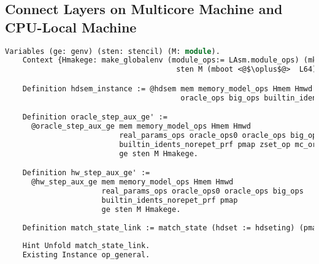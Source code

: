 \begin{lstlisting}[language=Caml]
\end{lstlisting}

\begin{lstlisting}[language=Caml]
\end{lstlisting}

\begin{lstlisting}[language=Caml]
\end{lstlisting}


\begin{lstlisting}[language=Caml]
\end{lstlisting}


\clearpage
\subsection{Connect Layers on Multicore Machine and CPU-Local Machine}
\label{chapter:certikos:subsec:connect-multicore}

\begin{lstlisting}[language=Caml]
    Variables (ge: genv) (sten: stencil) (M: module).
    Context {Hmakege: make_globalenv (module_ops:= LAsm.module_ops) (mkp_ops:= make_program_ops) 
                                       sten M (mboot <@$\oplus$@>  L64) = ret ge}.

    Definition hdsem_instance := @hdsem mem memory_model_ops Hmem Hmwd real_params_ops oracle_ops0
                                        oracle_ops big_ops builtin_idents_norepet_prf ge sten M Hmakege.

    Definition oracle_step_aux_ge' :=
      @oracle_step_aux_ge mem memory_model_ops Hmem Hmwd
                          real_params_ops oracle_ops0 oracle_ops big_ops
                          builtin_idents_norepet_prf pmap zset_op mc_oracle
                          ge sten M Hmakege.

    Definition hw_step_aux_ge' :=
      @hw_step_aux_ge mem memory_model_ops Hmem Hmwd
                      real_params_ops oracle_ops0 oracle_ops big_ops
                      builtin_idents_norepet_prf pmap
                      ge sten M Hmakege.
                      
    Definition match_state_link := match_state (hdset := hdseting) (pmap := pmap) current_CPU_ID.
    
    Hint Unfold match_state_link.
    Existing Instance op_general.                      
                      
\end{lstlisting}

